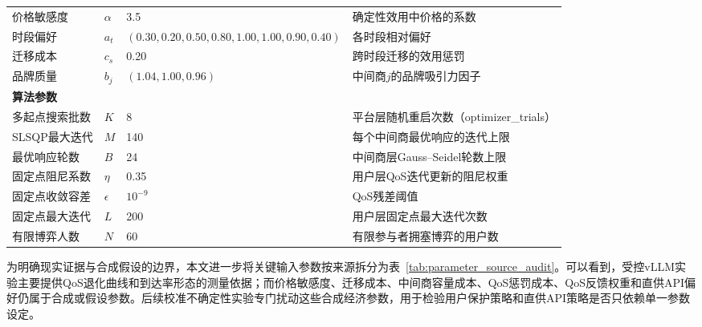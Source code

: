 \documentclass[UTF8,11pt]{ctexart}
\begin{document}
\begin{table}[H]
{\begin{tabular}{llll}
价格敏感度    & $\alpha$ & 3.5  & 确定性效用中价格的系数 \\
时段偏好      & $a_t$   & $(0.30,0.20,0.50,0.80,1.00,1.00,0.90,0.40)$ & 各时段相对偏好 \\
迁移成本      & $c_s$   & 0.20 & 跨时段迁移的效用惩罚 \\
品牌质量      & $b_j$   & $(1.04,1.00,0.96)$ & 中间商$j$的品牌吸引力因子 \\
\midrule
\multicolumn{4}{l}{\textbf{算法参数}} \\
多起点搜索批数 & $K$    & 8    & 平台层随机重启次数（optimizer\_trials） \\
SLSQP最大迭代 & $M$  & 140  & 每个中间商最优响应的迭代上限 \\
最优响应轮数 & $B$  & 24  & 中间商层Gauss--Seidel轮数上限 \\
固定点阻尼系数 & $\eta$  & 0.35 & 用户层QoS迭代更新的阻尼权重 \\
固定点收敛容差 & $\epsilon$  & $10^{-9}$ & QoS残差阈值 \\
固定点最大迭代 & $L$    & 200  & 用户层固定点最大迭代次数 \\
有限博弈人数  & $N$    & 60   & 有限参与者拥塞博弈的用户数 \\
\bottomrule
\end{tabular}%
}
\end{table}

为明确现实证据与合成假设的边界，本文进一步将关键输入参数按来源拆分为表~\ref{tab:parameter_source_audit}。可以看到，受控vLLM实验主要提供QoS退化曲线和到达率形态的测量依据；而价格敏感度、迁移成本、中间商容量成本、QoS惩罚成本、QoS反馈权重和直供API偏好仍属于合成或假设参数。后续校准不确定性实验专门扰动这些合成经济参数，用于检验用户保护策略和直供API策略是否只依赖单一参数设定。

\begin{table}[H]
\centering
\caption{关键参数来源审计}
\label{tab:parameter_source_audit}
\small
{}
\end{table}
\end{document}

